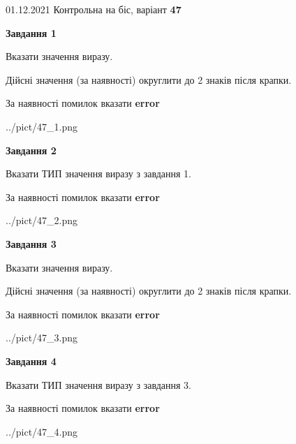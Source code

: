 \documentclass[11pt, ukrainian]{article}
\begin{document}
{01.12.2021 Контрольна на біс, варіант  \No \textbf { 47 }\par}
{
\begin {large}
{\begin {center}\textbf{Завдання 1}\end {center}}\par
Вказати значення виразу. \par
Дійсні значення (за наявності) округлити до 2 знаків після крапки. \par
За наявності помилок вказати \textbf{error}

\begin{center}
	{../pict/47_1.png}
\end{center}
\newpage

{\begin {center}\textbf{Завдання 2}\end {center}}\par
Вказати ТИП значення виразу з завдання 1. \par
За наявності помилок вказати \textbf{error}

\begin{center}
	{../pict/47_2.png}
\end{center}
\newpage

{\begin {center}\textbf{Завдання 3}\end {center}}\par
Вказати значення виразу. \par
Дійсні значення (за наявності) округлити до 2 знаків після крапки. \par
За наявності помилок вказати \textbf{error}

\begin{center}
	{../pict/47_3.png}
\end{center}
\newpage

{\begin {center}\textbf{Завдання 4}\end {center}}\par
Вказати ТИП значення виразу з завдання 3. \par
За наявності помилок вказати \textbf{error}

\begin{center}
	{../pict/47_4.png}
\end{center}
\newpage


\end{large}}
\end{document}
